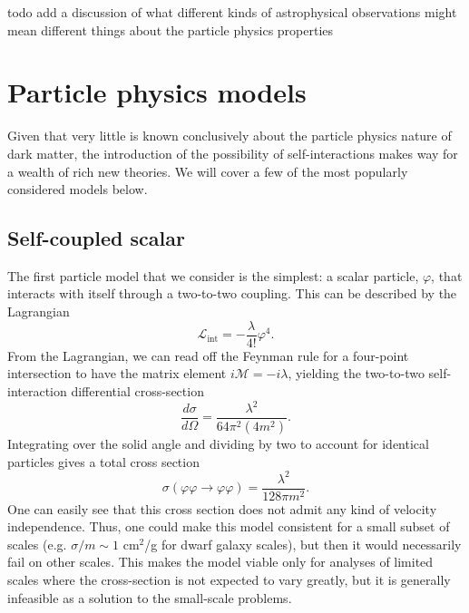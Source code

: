 todo add a discussion of what different kinds of astrophysical observations
might mean different things about the particle physics properties

\hypertarget{particle-physics-models}{%
\section{Particle physics models}\label{particle-physics-models}}

Given that very little is known conclusively about the particle physics
nature of dark matter, the introduction of the possibility of
self-interactions makes way for a wealth of rich new theories. We will
cover a few of the most popularly considered models below.

\hypertarget{self-coupled-scalar}{%
\subsection{Self-coupled scalar}\label{self-coupled-scalar}}

The first particle model that we consider is the simplest: a scalar
particle, $\varphi$, that interacts with itself through a two-to-two coupling.
This can be described by the Lagrangian
\begin{equation}
\mathcal{L}_{\text{int}} = -\frac{\lambda}{4!} \varphi^4.
\end{equation}
From the Lagrangian, we can read off the Feynman rule for a four-point
intersection to have the matrix element \(i\mathcal{M} = -i\lambda\), yielding
the two-to-two self-interaction differential cross-section
\begin{equation}
\frac{d\sigma}{d\Omega} = \frac{\lambda^2}{64\pi^2 (4m^2)}.
\end{equation}
Integrating over the solid angle and dividing by two to account for identical
particles gives a total cross section
\begin{equation}
\sigma(\varphi\varphi\to\varphi\varphi) = \frac{\lambda^2}{128\pi m^2}.
\end{equation}
One can easily see that this cross section does not admit any kind of
velocity independence. Thus, one could make this model consistent for a
small subset of scales (e.g. \(\sigma/m \sim 1\) cm\(^2\)/g for dwarf galaxy
scales), but then it would necessarily fail on other scales. This makes the
model viable only for analyses of limited scales where the cross-section is
not expected to vary greatly, but it is generally infeasible as a solution to
the small-scale problems.

